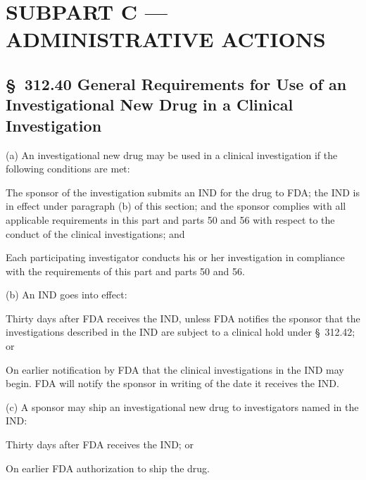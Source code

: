 \documentclass[11pt]{article}
\begin{document}
\clearpage

\section{SUBPART C --- ADMINISTRATIVE ACTIONS}

\subsection{\S~312.40 General Requirements for Use of an Investigational New Drug in a Clinical Investigation}

(a) An investigational new drug may be used in a clinical investigation if the following conditions are met:

\begin{description}[leftmargin=0.5cm,style=sameline]
\item[(1)] The sponsor of the investigation submits an IND for the drug to FDA; the IND is in effect under paragraph (b) of this section; and the sponsor complies with all applicable requirements in this part and parts 50 and 56 with respect to the conduct of the clinical investigations; and
\item[(2)] Each participating investigator conducts his or her investigation in compliance with the requirements of this part and parts 50 and 56.
\end{description}

(b) An IND goes into effect:

\begin{description}[leftmargin=0.5cm,style=sameline]
\item[(1)] Thirty days after FDA receives the IND, unless FDA notifies the sponsor that the investigations described in the IND are subject to a clinical hold under \S~312.42; or
\item[(2)] On earlier notification by FDA that the clinical investigations in the IND may begin. FDA will notify the sponsor in writing of the date it receives the IND.
\end{description}

(c) A sponsor may ship an investigational new drug to investigators named in the IND:

\begin{description}[leftmargin=0.5cm,style=sameline]
\item[(1)] Thirty days after FDA receives the IND; or
\item[(2)] On earlier FDA authorization to ship the drug.
\end{description}
\end{document}
